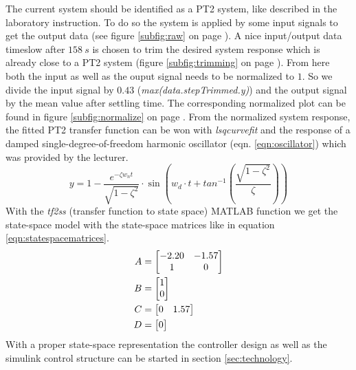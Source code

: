 The current system should be identified as a PT2 system, like described in the laboratory instruction. \cite{Laborleitfaden} To do so the system is applied by some input signals to get the output data (see figure \ref{subfig:raw} on page \pageref{subfig:raw}). A nice input/output data timeslow after $\SI{158}{s}$ is chosen to trim the desired system response which is already close to a PT2 system (figure \ref{subfig:trimming} on page \pageref{subfig:trimming}). From here both the input as well as the ouput signal needs to be normalized to $1$. So we divide the input signal by $0.43$ (\textit{max(data.stepTrimmed.y)}) and the output signal by the mean value after settling time. The corresponding normalized plot can be found in figure \ref{subfig:normalize} on page \pageref{subfig:normalize}. From the normalized system response, the fitted PT2 transfer function can be won with \textit{lsqcurvefit} and the response of a damped single-degree-of-freedom harmonic oscillator (eqn. \ref{eqn:oscillator}) which was provided by the lecturer.
\begin{equation}
    y = 1 - \frac{e^{-\zeta w_n t}}{\sqrt{1 - \zeta^2}} \cdot \sin(w_d \cdot t +  tan^{-1} \left(\frac{\sqrt{1 - \zeta^2}}{{\zeta}}\right))
    \label{eqn:oscillator}
\end{equation}
With the \textit{tf2ss} (transfer function to state space) MATLAB function we get the state-space model with the state-space matrices like in equation \ref{eqn:statespacematrices}.
\begin{equation}
\begin{split}
    A &= \begin{bmatrix} -2.20 & -1.57 \cr 1 & 0 \end{bmatrix} \\
    B &= \begin{bmatrix} 1 \cr 0 \end{bmatrix} \\
    C &= \begin{bmatrix} 0 & 1.57 \end{bmatrix} \\
    D &= \begin{bmatrix} 0 \end{bmatrix} \\
    \label{eqn:statespacematrices}
\end{split}
\end{equation}
With a proper state-space representation the controller design as well as the simulink control structure can be started in section \ref{sec:technology}.